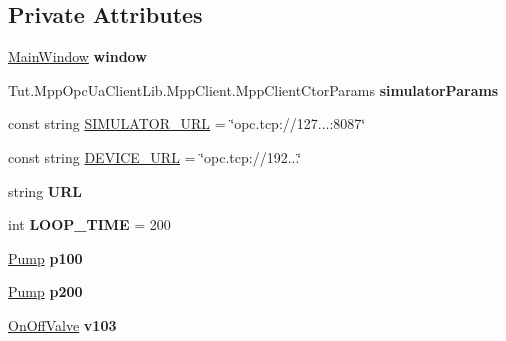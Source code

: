 \subsection*{Private Attributes}
\begin{DoxyCompactItemize}
\item 
\mbox{\label{class_a_s_e6030_1_1_controller_a10e880717ab8856d38db3bf3cde053c9}} 
\hyperlink{class_a_s_e6030_1_1_main_window}{Main\+Window} {\bfseries window}
\item 
\mbox{\label{class_a_s_e6030_1_1_controller_a2e009a3dfc8bdf97720f80c4b964ac14}} 
Tut.\+Mpp\+Opc\+Ua\+Client\+Lib.\+Mpp\+Client.\+Mpp\+Client\+Ctor\+Params {\bfseries simulator\+Params}
\item 
const string \hyperlink{class_a_s_e6030_1_1_controller_a6fca165bf2388426d598f23ac8d9acd6}{S\+I\+M\+U\+L\+A\+T\+O\+R\+\_\+\+U\+RL} = \char`\"{}opc.\+tcp\+://127...\+:8087\char`\"{}
\item 
const string \hyperlink{class_a_s_e6030_1_1_controller_a2011ff29fbc80180267d0aba04e903aa}{D\+E\+V\+I\+C\+E\+\_\+\+U\+RL} = \char`\"{}opc.\+tcp\+://192...\char`\"{}
\item 
\mbox{\label{class_a_s_e6030_1_1_controller_a89786f98405cbb27933eb00182d03c9a}} 
string {\bfseries U\+RL}
\item 
\mbox{\label{class_a_s_e6030_1_1_controller_a64624861c96c4570085f096079a2e317}} 
int {\bfseries L\+O\+O\+P\+\_\+\+T\+I\+ME} = 200
\item 
\mbox{\label{class_a_s_e6030_1_1_controller_a5ab5f075cbe2e1882c444557c57f7602}} 
\hyperlink{class_a_s_e6030_1_1_pump}{Pump} {\bfseries p100}
\item 
\mbox{\label{class_a_s_e6030_1_1_controller_a1e39f7d76e8e53e0927fbdf667860450}} 
\hyperlink{class_a_s_e6030_1_1_pump}{Pump} {\bfseries p200}
\item 
\mbox{\label{class_a_s_e6030_1_1_controller_aaa206db707757508ca7d76fd0f3ef339}} 
\hyperlink{class_a_s_e6030_1_1_on_off_valve}{On\+Off\+Valve} {\bfseries v103}

\end{DoxyCompactItemize}
